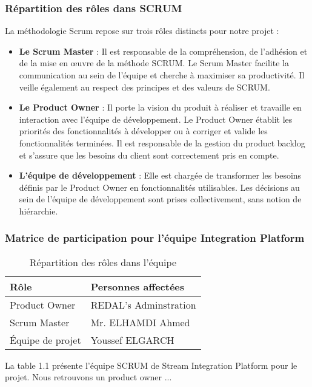 \subsubsection{Répartition des rôles dans SCRUM}
La méthodologie Scrum repose sur trois rôles distincts pour notre projet :
\begin{itemize}
    \item \textbf{Le Scrum Master} : Il est responsable de la compréhension, de l’adhésion et de la mise en œuvre de la méthode SCRUM. Le Scrum Master facilite la communication au sein de l’équipe et cherche à maximiser sa productivité. Il veille également au respect des principes et des valeurs de SCRUM.
    \item \textbf{Le Product Owner} : Il porte la vision du produit à réaliser et travaille en interaction avec l’équipe de développement. Le Product Owner établit les priorités des fonctionnalités à développer ou à corriger et valide les fonctionnalités terminées. Il
    est responsable de la gestion du product backlog et s’assure que les besoins du client sont correctement pris en compte.
    \item \textbf{L’équipe de développement} : Elle est chargée de transformer les besoins définis par le Product Owner en fonctionnalités utilisables. Les décisions au sein de l’équipe de développement sont prises collectivement, sans notion de hiérarchie.
    
\end{itemize}

\subsubsection{Matrice de participation pour l’équipe Integration Platform}

\begin{table}[H]
\centering
\begin{tabular}{|l|p{10cm}|}
\hline
\textbf{Rôle} & \textbf{Personnes affectées} \\ \hline
Product Owner &  REDAL's Adminstration\\ \hline
Scrum Master & Mr. ELHAMDI Ahmed\\ \hline
Équipe de projet & Youssef ELGARCH\\ \hline
\end{tabular}
\caption{Répartition des rôles dans l'équipe}
\label{tab:roles}
\end{table}
La table 1.1 présente l’équipe SCRUM de Stream Integration Platform pour le projet. Nous retrouvons un product owner ...

